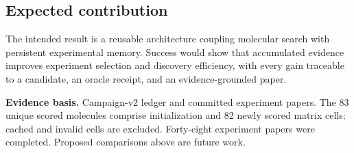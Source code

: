 \documentclass[11pt,a4paper]{article}
\begin{document}
\subsection*{Expected contribution}
The intended result is a reusable architecture coupling molecular search with persistent experimental memory. Success would show that accumulated evidence improves experiment selection and discovery efficiency, with every gain traceable to a candidate, an oracle receipt, and an evidence-grounded paper.

\vfill
{\footnotesize\color{muted}\textbf{Evidence basis.} Campaign-v2 ledger and committed experiment papers. The 83 unique scored molecules comprise initialization and 82 newly scored matrix cells; cached and invalid cells are excluded. Forty-eight experiment papers were completed. Proposed comparisons above are future work.}
\end{document}
